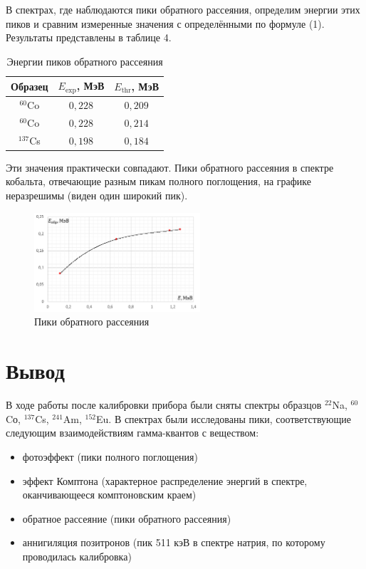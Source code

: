 \documentclass[a4paper]{article}
\begin{document}
\noindent В спектрах, где наблюдаются пики обратного рассеяния, определим энергии этих пиков и сравним измеренные значения с определёнными по формуле (1). Результаты представлены в таблице 4. 

\begin{table}[!ht]
    \centering
    \caption{Энергии пиков обратного рассеяния}
    \begin{tabular}{|c|c|c|}
    \hline
    Образец & $E_{\text{exp}}$, МэВ & $E_{\text{thr}}$, МэВ \\ \hline
    $^{60}$Co      & $0,228$               & $0,209$               \\ \hline
    $^{60}$Co      & $0,228$               & $0,214$               \\ \hline
    $^{137}$Cs      & $0,198$               & $0,184$               \\ \hline
    \end{tabular}
\end{table}

\noindent Эти значения практически совпадают. Пики обратного рассеяния в спектре кобальта, отвечающие разным пикам полного поглощения, на графике неразрешимы (виден один широкий пик).

\begin{figure}[!ht]
    \begin{center}
        \includegraphics[width = 0.55\textwidth]{image/pic4.png}
        \caption{Пики обратного рассеяния}
    \end{center}
\end{figure}

\section{Вывод}

В ходе работы после калибровки прибора были сняты спектры образцов $^{22}$Na,  $^{60}$Cо,  $^{137}$Cs, $^{241}$Am, $^{152}$Eu. В спектрах были исследованы пики, соответствующие следующим взаимодействиям гамма-квантов с веществом:
\begin{itemize}
    \item фотоэффект (пики полного поглощения)
    \item эффект Комптона (характерное распределение энергий в спектре, оканчивающееся комптоновским краем)
    \item обратное рассеяние (пики обратного рассеяния)
    \item аннигиляция позитронов (пик 511 кэВ в спектре натрия, по которому проводилась калибровка)
\end{itemize}
\end{document}
